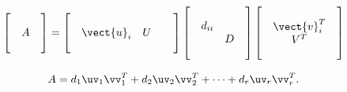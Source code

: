 \begin{frame}
  \[
  \begin{bmatrix}
    & & \\
    & A & \\
    & &
  \end{bmatrix} =
  \begin{bmatrix}
    & & & &\\
    & \vect{u}_i & U & &\\
    & & & &
  \end{bmatrix} 
  \begin{bmatrix}
    & & & \\
    & d_{ii} & & \\
    & & D & \\
    & & &
  \end{bmatrix} 
  \begin{bmatrix}
    & & \\
    & \vect{v}^T_i & \\
    & V^T & \\
    & &
  \end{bmatrix} 
  \]

  \pause
  \vspace{0.9in}
  \[
  A =
  d_1\uv_1\vv^T_1 +
  d_2\uv_2\vv^T_2 +\cdots+
  d_r\uv_r\vv^T_r.
  \]
  \vspace{0.9in}
\end{frame}
